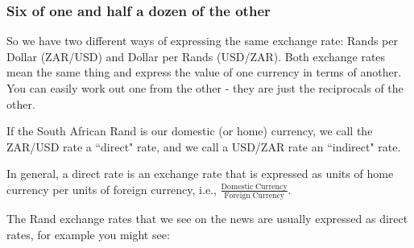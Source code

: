         
        \label{m39335*uid3}
            \subsubsection{ Six of one and half a dozen of the other}
            \nopagebreak
            
          
          \label{m39335*id67548}So we have two different ways of expressing the same exchange rate: Rands per Dollar (ZAR/USD) and Dollar per Rands (USD/ZAR). Both exchange rates mean the same thing and express the value of one currency in terms of another. You can easily work out one from the other - they are just the reciprocals of the other.\par 
          \label{m39335*id67554}If the South African Rand is our domestic (or home) currency, we call the ZAR/USD rate a ``direct" rate, and we call a USD/ZAR rate an ``indirect" rate.\par 
          \label{m39335*id67560}In general, a direct rate is an exchange rate that is expressed as units of home currency per units of foreign currency, i.e., \begin{math}\frac{\mathrm{Domestic\; Currency}}{\mathrm{Foreign\; Currency}}\end{math}.\par 
          \label{m39335*id67583}The Rand exchange rates that we see on the news are usually expressed as direct rates, for example you might see:\par 
          
    
      
    
    \setlength\mytablespace{4\tabcolsep}
    \addtolength\mytablespace{3\arrayrulewidth}
    \setlength\mytablewidth{\linewidth}
        
    
    \setlength\mytableroom{\mytablewidth}
    \addtolength\mytableroom{-\mytablespace}
    
    \setlength\myfixedwidth{0pt}
    \setlength\mystarwidth{\mytableroom}
        \addtolength\mystarwidth{-\myfixedwidth}
        \divide{}
        
